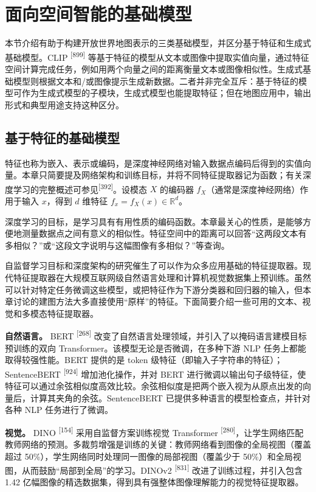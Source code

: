\section{面向空间智能的基础模型}

本节介绍有助于构建开放世界地图表示的三类基础模型，并区分基于特征和生成式基础模型。CLIP \textsuperscript{[899]} 等基于特征的模型从文本或图像中提取实值向量，通过特征空间计算完成任务，例如用两个向量之间的距离衡量文本或图像相似性。生成式基础模型则根据文本和/或图像提示生成新数据。二者并非完全互斥：基于特征的模型可作为生成式模型的子模块，生成式模型也能提取特征；但在地图应用中，输出形式和典型用途支持这种区分。

\subsection{基于特征的基础模型}

特征也称为嵌入、表示或编码，是深度神经网络对输入数据点编码后得到的实值向量。本章只简要提及网络架构和训练目标，并将不同特征提取器记为函数；有关深度学习的完整概述可参见\textsuperscript{[392]}。设模态 $X$ 的编码器 $f_X$（通常是深度神经网络）作用于输入 $x$，得到 $d$ 维特征 $f_x=f_X(x)\in\mathbb{R}^d$。

深度学习的目标，是学习具有有用性质的编码函数。本章最关心的性质，是能够方便地测量数据点之间有意义的相似性。特征空间中的距离可以回答“这两段文本有多相似？”或“这段文字说明与这幅图像有多相似？”等查询。

自监督学习目标和深度架构的研究催生了可以作为众多应用基础的特征提取器。现代特征提取器在大规模互联网级自然语言处理和计算机视觉数据集上预训练。虽然可以针对特定任务微调这些模型，或把特征作为下游分类器和回归器的输入，但本章讨论的建图方法大多直接使用“原样”的特征。下面简要介绍一些可用的文本、视觉和多模态特征提取器。

\textbf{自然语言。} BERT \textsuperscript{[268]} 改变了自然语言处理领域，并引入了以掩码语言建模目标预训练的双向 Transformer。该模型无论是否微调，在多种下游 NLP 任务上都能取得较强性能。BERT 提供的是 token 级特征（即输入子字符串的特征）；SentenceBERT \textsuperscript{[924]} 增加池化操作，并对 BERT 进行微调以输出句子级特征，使特征可以通过余弦相似度高效比较。余弦相似度是把两个嵌入视为从原点出发的向量后，计算其夹角的余弦。SentenceBERT 已提供多种语言的模型检查点，并针对各种 NLP 任务进行了微调。

\textbf{视觉。} DINO \textsuperscript{[154]} 采用自监督方案训练视觉 Transformer \textsuperscript{[280]}，让学生网络匹配教师网络的预测。多裁剪增强是训练的关键：教师网络看到图像的全局视图（覆盖超过 50\%），学生网络同时处理同一图像的局部视图（覆盖少于 50\%）和全局视图，从而鼓励“局部到全局”的学习。DINOv2 \textsuperscript{[831]} 改进了训练过程，并引入包含 1.42 亿幅图像的精选数据集，得到具有强整体图像理解能力的视觉特征提取器。


